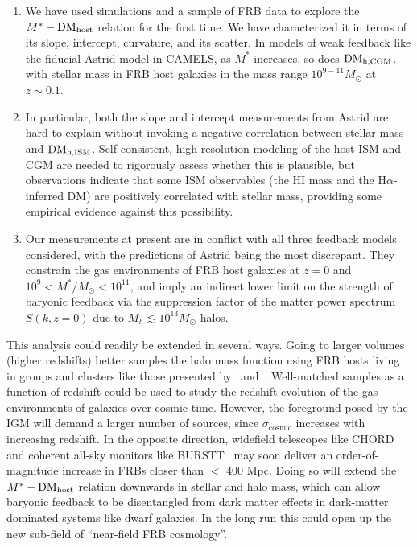 \documentclass[twocolumn,linenumbers]{aastex631}
\newcommand{\dmh}{\ensuremath{{\rm DM}_\textrm{host}}}
\newcommand{\dmhism}{\ensuremath{{\rm DM}_\textrm{h,ISM}}}
\newcommand{\dmhcgm}{\ensuremath{{\rm DM}_\textrm{h,CGM}}}
\newcommand{\sigmacosmic}{\ensuremath{{\sigma}_\textrm{cosmic}}}
\begin{document}
\begin{enumerate}
    \item We have used simulations and a sample of FRB data to explore the $M^*-\dmh$ relation for the first time. We have characterized it in terms of its slope, intercept, curvature, and its scatter. In models of weak feedback like the fiducial Astrid model in CAMELS, as $M^*$ increases, so does \dmhcgm. 
with stellar mass in FRB host galaxies in the mass range $10^{9-11} M_\odot$ at $z \sim 0.1$. 
    \item In particular, both the slope and intercept measurements from Astrid are hard to explain without invoking a negative correlation between stellar mass and \dmhism. Self-consistent, high-resolution modeling of the host ISM and CGM are needed to rigorously assess whether this is plausible, but observations indicate that some ISM observables (the HI mass and the H$\alpha$-inferred DM) are positively correlated with stellar mass, providing some empirical evidence against this possibility.
    \item Our measurements at present are in conflict with all three feedback models considered, with the predictions of Astrid being the most discrepant. They constrain the gas environments of FRB host galaxies at $z = 0$ and $10^9 < M^*/M_\odot < 10^{11}$, and imply an indirect lower limit on the strength of baryonic feedback via the suppression factor of the matter power spectrum $S(k,z=0)$ due to $M_h \lesssim 10^{13} M_\odot$ halos.
\end{enumerate}

This analysis could readily be extended in several ways. Going to larger volumes (higher redshifts) better samples the halo mass function using FRB hosts living in groups and clusters like those presented by~\citet{connor2023deep} and~\citet{chime2025catalog}. 
Well-matched samples as a function of redshift could be used to study the redshift evolution of the gas environments of galaxies over cosmic time. 
However, the foreground posed by the IGM will demand a larger number of sources, since $\sigmacosmic$ increases with increasing redshift. 
In the opposite direction, widefield telescopes like CHORD~\citep{vanderlinde2019canadian} and coherent all-sky monitors like BURSTT~\citep{lin2022burstt,connor2022stellar} may soon deliver an order-of-magnitude increase in FRBs closer than $<$ 400 Mpc. 
Doing so will extend the $M^*-\dmh$ relation downwards in stellar and halo mass, which can allow baryonic feedback to be disentangled from dark matter effects in dark-matter dominated systems like dwarf galaxies. In the long run this could open up the new sub-field of ``near-field FRB cosmology''. 
\end{document}
